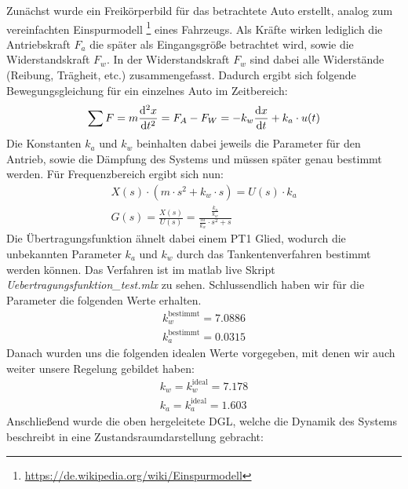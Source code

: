Zunächst wurde ein Freikörperbild für das betrachtete Auto erstellt, analog zum
vereinfachten Einspurmodell
\footnote{\url{https://de.wikipedia.org/wiki/Einspurmodell}} eines Fahrzeugs.
Als Kräfte wirken lediglich die Antriebskraft $F_a$ die später als
Eingangsgröße betrachtet wird, sowie die Widerstandskraft $F_w$. In der
Widerstandskraft $F_w$ sind dabei alle Widerstände (Reibung, Trägheit, etc.)
zusammengefasst. Dadurch ergibt sich folgende Bewegungsgleichung für ein
einzelnes Auto im Zeitbereich:
\begin{align*}
    \sum F = m \frac{\mathop{}\!\mathrm{d}^2 x}{\mathop{}\!\mathrm{d} t^2} = F_A -F_W = -k_w \frac{\mathop{}\!\mathrm{d}
    x}{\mathop{}\!\mathrm{d} t} + k_a \cdot u(t)
\end{align*}
Die Konstanten $k_a$ und $k_w$ beinhalten dabei jeweils die Parameter für den
Antrieb, sowie die Dämpfung des Systems und müssen später genau bestimmt werden.
Für Frequenzbereich ergibt sich nun:
\begin{align*}
    X(s) \cdot (m \cdot s^2 + k_w \cdot s) = U(s) \cdot k_a \\
    G(s) = \frac{X(s)}{U(s)} = \frac{\frac{k_a}{k_w}}{\frac{m}{k_w} \cdot s^2 + s}
\end{align*}
Die Übertragungsfunktion ähnelt dabei einem PT1 Glied, wodurch die unbekannten
Parameter $k_a$ und $k_w$ durch das Tankentenverfahren bestimmt werden können.
Das Verfahren ist im matlab live Skript
\textit{Uebertragungsfunktion\_test.mlx} zu sehen. Schlussendlich haben wir für
die Parameter die folgenden Werte erhalten.
\begin{align*}
    k_w^{\mathrm{bestimmt}} = 7.0886\\
    k_a^{\mathrm{bestimmt}} = 0.0315 
\end{align*}
Danach wurden uns die folgenden idealen Werte vorgegeben, mit denen wir auch
weiter unsere Regelung gebildet haben:
\begin{align*}
    k_w = k_w^{\mathrm{ideal}} = 7.178\\
    k_a = k_a^{\mathrm{ideal}} = 1.603 
\end{align*}
Anschließend wurde die oben hergeleitete DGL, welche die Dynamik des Systems
beschreibt in eine Zustandsraumdarstellung gebracht:
